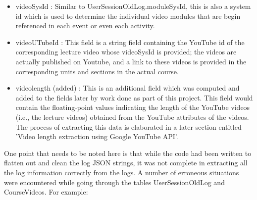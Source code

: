\documentclass[16pt]{report}
\begin{document}
\begin{itemize}
\begin{itemize}
\item videoSysId : Similar to UserSessionOldLog.moduleSysId, this is also a system id which is used to determine the individual video modules that are begin referenced in each event or even each activity.
\item videoUTubeId : This field is a string field containing the YouTube id of the corresponding lecture video whose videoSysId is provided; the videos are actually published on Youtube, and a link to these videos is provided in the corresponding units and sections in the actual course.
\item videolength (added) : This is an additional field which was computed and added to the fields later by work done as part of this project. This field would contain the floating-point values indicating the length of the YouTube videos (i.e., the lecture videos) obtained from the YouTube attributes of the videos. The process of extracting this data is elaborated in a later section entitled 'Video length extraction using Google YouTube API'.
\end{itemize}

\end{itemize}


One point that needs to be noted here is that while the code had been written to flatten out and clean the log JSON strings, it was not complete in extracting all the log information correctly from the logs. A number of erroneous situations were encountered while going through the tables UserSessionOldLog and CourseVideos. For example:
\end{document}
